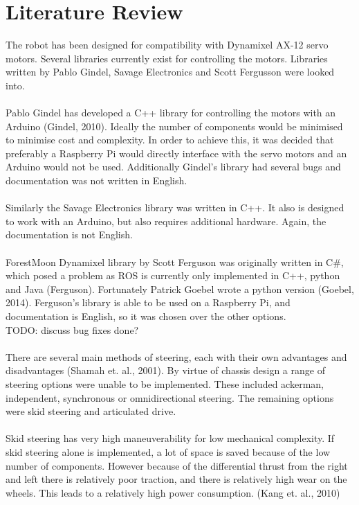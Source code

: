 \documentclass[]{article}
\begin{document}
\section{Literature Review}

The robot has been designed for compatibility with Dynamixel AX-12 servo motors. Several libraries currently exist for controlling the motors. Libraries written by Pablo Gindel, Savage Electronics and Scott Fergusson were looked into.
\\
\\
Pablo Gindel has developed a C++ library for controlling the motors with an Arduino (Gindel, 2010). Ideally the number of components would be minimised to minimise cost and complexity. In order to achieve this, it was decided that preferably a Raspberry Pi would directly interface with the servo motors and an Arduino would not be used. Additionally Gindel's library had several bugs and documentation was not written in English.
\\
\\
Similarly the Savage Electronics library was written in C++. It also is designed to work with an Arduino, but also requires additional hardware. Again, the documentation is not English.
\\
\\
ForestMoon Dynamixel library by Scott Ferguson was originally written in C\#, which posed a problem as ROS is currently only implemented in C++, python and Java (Ferguson). Fortunately Patrick Goebel wrote a python version (Goebel, 2014). Ferguson's library is able to be used on a Raspberry Pi, and documentation is English, so it was chosen over the other options.
\\
TODO: discuss bug fixes done?
\\
\\
There are several main methods of steering, each with their own advantages and disadvantages (Shamah et. al., 2001). By virtue of chassis design a range of steering options were unable to be implemented. These included ackerman, independent, synchronous or omnidirectional steering. The remaining options were skid steering and articulated drive.
\\
\\
Skid steering has very high maneuverability for low mechanical complexity. If skid steering alone is implemented, a lot of space is saved because of the low number of components. However because of the differential thrust from the right and left there is relatively poor traction, and there is relatively high wear on the wheels. This leads to a relatively high power consumption. (Kang et. al., 2010)
\end{document}

